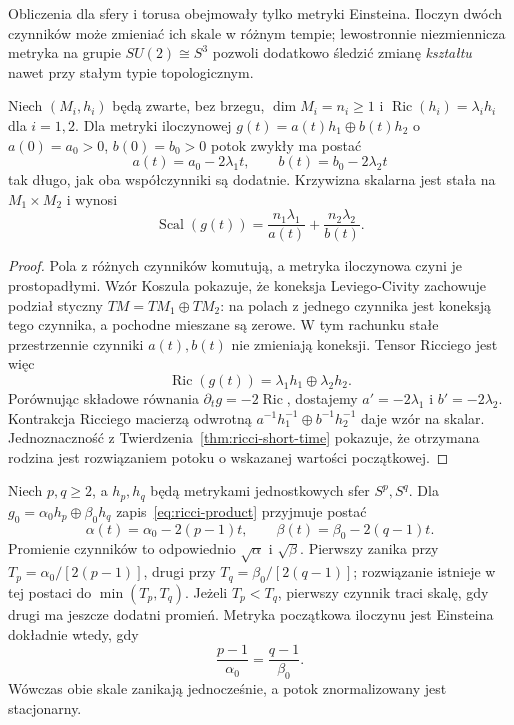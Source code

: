 Obliczenia dla sfery i torusa obejmowały tylko metryki
Einsteina. Iloczyn dwóch czynników może zmieniać ich skale
w różnym tempie; lewostronnie niezmiennicza metryka na
grupie $SU(2)\cong S^3$ pozwoli dodatkowo śledzić zmianę
\emph{kształtu} nawet przy stałym typie topologicznym.

\begin{stwierdzenie}
\label{prop:ricci-product}
Niech $(M_i,h_i)$ będą zwarte, bez brzegu,
$\dim M_i=n_i\geq1$ i
$\operatorname{Ric}(h_i)=\lambda_i h_i$ dla $i=1,2$.
Dla metryki iloczynowej
$g(t)=a(t)h_1\oplus b(t)h_2$ o $a(0)=a_0>0$,
$b(0)=b_0>0$ potok zwykły ma postać
\begin{equation}\label{eq:ricci-product}
 a(t)=a_0-2\lambda_1t,\qquad
 b(t)=b_0-2\lambda_2t
\end{equation}
tak długo, jak oba współczynniki są dodatnie.
Krzywizna skalarna jest stała na $M_1\times M_2$ i wynosi
\begin{equation}\label{eq:ricci-product-scalar}
 \operatorname{Scal}(g(t))
 =\frac{n_1\lambda_1}{a(t)}
  +\frac{n_2\lambda_2}{b(t)}.
\end{equation}
\end{stwierdzenie}
\begin{proof}
Pola z różnych czynników komutują, a metryka iloczynowa
czyni je prostopadłymi. Wzór Koszula pokazuje, że
koneksja Leviego-Civity zachowuje podział styczny
$TM=TM_1\oplus TM_2$: na polach z jednego czynnika
jest koneksją tego czynnika, a pochodne mieszane są zerowe.
W tym rachunku stałe przestrzennie czynniki $a(t),b(t)$
nie zmieniają koneksji. Tensor Ricciego jest więc
\[
 \operatorname{Ric}(g(t))
   =\lambda_1h_1\oplus\lambda_2h_2.
\]
Porównując składowe równania $\partial_tg=-2\operatorname{Ric}$,
dostajemy $a'=-2\lambda_1$ i $b'=-2\lambda_2$.
Kontrakcja Ricciego macierzą odwrotną
$a^{-1}h_1^{-1}\oplus b^{-1}h_2^{-1}$ daje wzór
na skalar. Jednoznaczność z Twierdzenia~\ref{thm:ricci-short-time}
pokazuje, że otrzymana rodzina jest rozwiązaniem potoku
o wskazanej wartości początkowej.
\end{proof}

\begin{przyklad}
\label{prz:ricci-two-spheres}
Niech $p,q\geq2$, a $h_p,h_q$ będą metrykami jednostkowych
sfer $S^p,S^q$. Dla
$g_0=\alpha_0h_p\oplus\beta_0h_q$
zapis~\eqref{eq:ricci-product} przyjmuje postać
\begin{equation}\label{eq:ricci-two-spheres}
 \alpha(t)=\alpha_0-2(p-1)t,\qquad
 \beta(t)=\beta_0-2(q-1)t.
\end{equation}
Promienie czynników to odpowiednio $\sqrt\alpha$ i
$\sqrt\beta$. Pierwszy zanika przy
$T_p=\alpha_0/[2(p-1)]$, drugi przy
$T_q=\beta_0/[2(q-1)]$; rozwiązanie istnieje w tej
postaci do $\min(T_p,T_q)$. Jeżeli $T_p<T_q$, pierwszy
czynnik traci skalę, gdy drugi ma jeszcze dodatni promień.
Metryka początkowa iloczynu jest Einsteina dokładnie wtedy,
gdy
\begin{equation}\label{eq:ricci-product-einstein}
 \frac{p-1}{\alpha_0}=\frac{q-1}{\beta_0}.
\end{equation}
Wówczas obie skale zanikają jednocześnie, a potok
znormalizowany jest stacjonarny.
\end{przyklad}

